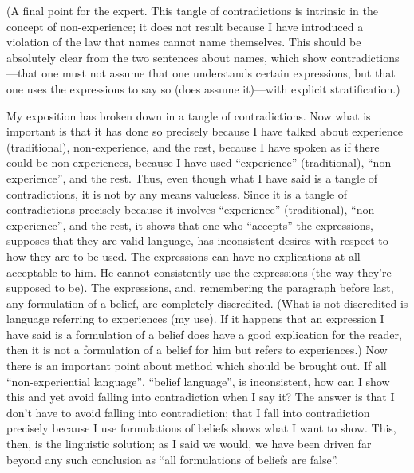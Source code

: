 (A final point for the expert. This 
tangle of contradictions is intrinsic in the concept of non-experience; it does 
not result because I have introduced a violation of the law that names cannot 
name themselves. This should be absolutely clear from the two sentences 
about names, which show contradictions---that one must not assume that 
one understands certain expressions, but that one uses the expressions to say 
so (does assume it)---with explicit stratification.) 

My exposition has broken down in a tangle of contradictions. Now 
what is important is that it has done so precisely because I have talked about 
experience (traditional), non-experience, and the rest, because I have spoken 
as if there could be non-experiences, because I have used \enquote{experience} 
(traditional), \enquote{non-experience}, and the rest. Thus, even though what I have 
said is a tangle of contradictions, it is not by any means valueless. Since it is 
a tangle of contradictions precisely because it involves \enquote{experience} 
(traditional), \enquote{non-experience}, and the rest, it shows that one who \enquote{accepts} 
the expressions, supposes that they are valid language, has inconsistent 
desires with respect to how they are to be used. The expressions can have no 
explications at all acceptable to him. He cannot consistently use the 
expressions (the way they're supposed to be). The expressions, and, 
remembering the paragraph before last, any formulation of a belief, are 
completely discredited. (What is not discredited is language referring to 
experiences (my use). If it happens that an expression I have said is a 
formulation of a belief does have a good explication for the reader, then it is 
not a formulation of a belief for him but refers to experiences.) Now there is 
an important point about method which should be brought out. If all 
\enquote{non-experiential language}, \enquote{belief language}, is inconsistent, how can I 
show this and yet avoid falling into contradiction when I say it? The answer 
is that I don't have to avoid falling into contradiction; that I fall into 
contradiction precisely because I use formulations of beliefs shows what I 
want to show. This, then, is the linguistic solution; as I said we would, we 
have been driven far beyond any such conclusion as \enquote{all formulations of 
beliefs are false}. 

